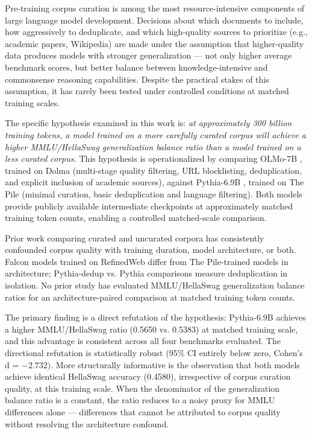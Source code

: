 
Pre-training corpus curation is among the most resource-intensive components of large language model development. Decisions about which documents to include, how aggressively to deduplicate, and which high-quality sources to prioritize (e.g., academic papers, Wikipedia) are made under the assumption that higher-quality data produces models with stronger generalization --- not only higher average benchmark scores, but better balance between knowledge-intensive and commonsense reasoning capabilities. Despite the practical stakes of this assumption, it has rarely been tested under controlled conditions at matched training scales.

The specific hypothesis examined in this work is: \textit{at approximately 300 billion training tokens, a model trained on a more carefully curated corpus will achieve a higher MMLU/HellaSwag generalization balance ratio than a model trained on a less curated corpus.} This hypothesis is operationalized by comparing OLMo-7B \citep{Groeneveld2024OLMo}, trained on Dolma \citep{Soldaini2024Dolma} (multi-stage quality filtering, URL blocklisting, deduplication, and explicit inclusion of academic sources), against Pythia-6.9B \citep{Biderman2023Pythia}, trained on The Pile \citep{Gao2020Pile} (minimal curation, basic deduplication and language filtering). Both models provide publicly available intermediate checkpoints at approximately matched training token counts, enabling a controlled matched-scale comparison.

Prior work comparing curated and uncurated corpora has consistently confounded corpus quality with training duration, model architecture, or both. Falcon models trained on RefinedWeb \citep{Penedo2023RefinedWeb} differ from The Pile-trained models in architecture; Pythia-dedup vs. Pythia comparisons \citep{Biderman2023Pythia} measure deduplication in isolation. No prior study has evaluated MMLU/HellaSwag generalization balance ratios for an architecture-paired comparison at matched training token counts.

The primary finding is a direct refutation of the hypothesis: Pythia-6.9B achieves a higher MMLU/HellaSwag ratio (0.5650 vs. 0.5383) at matched training scale, and this advantage is consistent across all four benchmarks evaluated. The directional refutation is statistically robust (95\% CI entirely below zero, Cohen's d = $-2.732)$. More structurally informative is the observation that both models achieve identical HellaSwag accuracy (0.4580), irrespective of corpus curation quality, at this training scale. When the denominator of the generalization balance ratio is a constant, the ratio reduces to a noisy proxy for MMLU differences alone --- differences that cannot be attributed to corpus quality without resolving the architecture confound.

